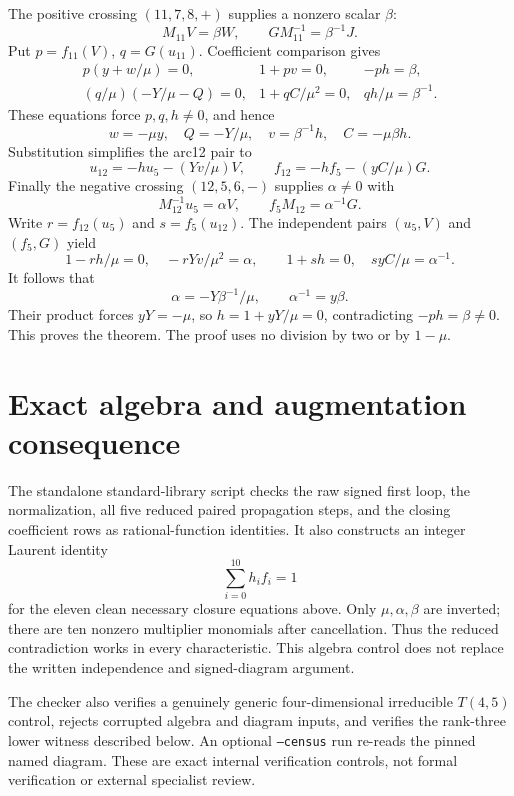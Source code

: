 \documentclass[11pt]{article}
\begin{document}
The positive crossing $(11,7,8,+)$ supplies a nonzero scalar $\beta$:
\[
 M_{11}V=\beta W,\qquad GM_{11}^{-1}=\beta^{-1}J.
\]
Put $p=f_{11}(V)$, $q=G(u_{11})$. Coefficient comparison gives
\[
\begin{array}{lll}
p(y+w/\mu)=0,&1+pv=0,&-ph=\beta,\\
(q/\mu)(-Y/\mu-Q)=0,&1+qC/\mu^2=0,&qh/\mu=\beta^{-1}.
\end{array}
\]
These equations force $p,q,h\ne0$, and hence
\[
w=-\mu y,\quad Q=-Y/\mu,\quad v=\beta^{-1}h,
\quad C=-\mu\beta h.
\]
Substitution simplifies the arc12 pair to
\[
u_{12}=-hu_5-(Yv/\mu)V,\qquad
f_{12}=-hf_5-(yC/\mu)G.
\]
Finally the negative crossing $(12,5,6,-)$ supplies $\alpha\ne0$ with
\[
 M_{12}^{-1}u_5=\alpha V,\qquad
 f_5M_{12}=\alpha^{-1}G.
\]
Write $r=f_{12}(u_5)$ and $s=f_5(u_{12})$.
The independent pairs $(u_5,V)$ and $(f_5,G)$ yield
\[
1-rh/\mu=0,\quad-rYv/\mu^2=\alpha,\qquad
1+sh=0,\quad syC/\mu=\alpha^{-1}.
\]
It follows that
\[
 \alpha=-Y\beta^{-1}/\mu,\qquad\alpha^{-1}=y\beta.
\]
Their product forces $yY=-\mu$, so $h=1+yY/\mu=0$,
contradicting $-ph=\beta\ne0$. This proves the theorem.
The proof uses no division by two or by $1-\mu$.

\section*{Exact algebra and augmentation consequence}
The standalone standard-library script
 checks the raw signed
first loop, the normalization, all five reduced paired propagation
steps, and the closing coefficient rows as rational-function identities.
It also constructs an integer Laurent identity
\[
                    \sum_{i=0}^{10}h_if_i=1
\]
for the eleven clean necessary closure equations above. Only
$\mu,\alpha,\beta$ are inverted; there are ten nonzero multiplier
monomials after cancellation. Thus the reduced contradiction works in
every characteristic. This algebra control does not replace the written
independence and signed-diagram argument.

The checker also verifies a genuinely generic four-dimensional
irreducible $T(4,5)$ control, rejects corrupted algebra and diagram
inputs, and verifies the rank-three lower witness described below.
An optional \texttt{--census} run re-reads the pinned named diagram.
These are exact internal verification controls, not formal verification
or external specialist review.
\end{document}
